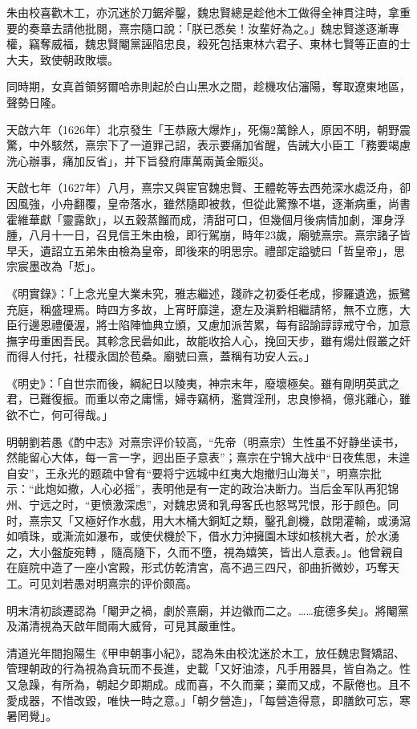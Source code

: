 朱由校喜歡木工，亦沉迷於刀鋸斧鑿，魏忠賢總是趁他木工做得全神貫注時，拿重要的奏章去請他批閱，熹宗隨口說：「朕已悉矣！汝輩好為之。」魏忠賢遂逐漸專權，竊奪威福，魏忠賢閹黨誣陷忠良，殺死包括東林六君子、東林七賢等正直的士大夫，致使朝政敗壞。

同時期，女真首領努爾哈赤則起於白山黑水之間，趁機攻佔瀋陽，奪取遼東地區，聲勢日隆。

天啟六年（1626年）北京發生「王恭廠大爆炸」，死傷2萬餘人，原因不明，朝野震驚，中外駭然，熹宗下了一道罪己詔，表示要痛加省醒，告誡大小臣工「務要竭慮洗心辦事，痛加反省」，并下旨發府庫萬兩黃金賑災。

天啟七年（1627年）八月，熹宗又與宦官魏忠賢、王體乾等去西苑深水處泛舟，卻因風強，小舟翻覆，皇帝落水，雖然隨即被救，但從此驚豫不堪，逐漸病重，尚書霍維華獻「靈露飲」，以五穀蒸餾而成，清甜可口，但幾個月後病情加劇，渾身浮腫，八月十一日，召見信王朱由檢，即行駕崩，時年23歲，廟號熹宗。熹宗諸子皆早夭，遺詔立五弟朱由檢為皇帝，即後來的明思宗。禮部定謚號曰「哲皇帝」，思宗宸墨改為「悊」。

《明實錄》：「上念光皇大業未究，雅志繼述，踐祚之初委任老成，摉羅遺逸，振鷺充庭，稱盛理焉。時四方多故，上宵旴靡遑，遼左及滇黔相繼請帑，無不立應，大臣行邊恩禮優渥，將士陷陣恤典立頒，又慮加派苦累，每有詔諭諄諄戒守令，加意撫字毋重困吾民。其軫念民碞如此，故能收拾人心，挽回天步，雖有煬灶假叢之奸而得人付托，社稷永固於苞桑。廟號曰熹，蓋稱有功安人云。」

《明史》：「自世宗而後，綱紀日以陵夷，神宗末年，廢壞極矣。雖有剛明英武之君，已難復振。而重以帝之庸懦，婦寺竊柄，濫賞淫刑，忠良慘禍，億兆離心，雖欲不亡，何可得哉。」

明朝劉若愚《酌中志》对熹宗评价较高，“先帝（明熹宗）生性虽不好静坐读书，然能留心大体，每一言一字，迥出臣子意表”；熹宗在宁锦大战中“日夜焦思，未遑自安”，王永光的题疏中曾有“要将宁远城中红夷大炮撤归山海关”，明熹宗批示：“此炮如撤，人心必摇”，表明他是有一定的政治决断力。当后金军队再犯锦州、宁远之时，“更愤激深虑”，对魏忠贤和乳母客氏也怒骂咒恨，形于颜色。同时，熹宗又「又極好作水戲，用大木桶大銅缸之類，鑿孔創機，啟閉灌輸，或湧瀉如噴珠，或澌流如瀑布，或使伏機於下，借水力沖擁園木球如核桃大者，於水湧之，大小盤旋宛轉 ，隨高隨下，久而不墮，視為嬉笑，皆出人意表。」。他曾親自在庭院中造了一座小宮殿，形式仿乾清宮，高不過三四尺，卻曲折微妙，巧奪天工。可见刘若愚对明熹宗的评价颇高。

明末清初談遷認為「閹尹之禍，劇於熹廟，并边徽而二之。……疵德多矣」。將閹黨及滿清視為天啟年間兩大威脅，可見其嚴重性。

清道光年間抱陽生《甲申朝事小紀》，認為朱由校沈迷於木工，放任魏忠賢矯詔、管理朝政的行為視為貪玩而不長進，史載「又好油漆，凡手用器具，皆自為之。性又急躁，有所為，朝起夕即期成。成而喜，不久而棄；棄而又成，不厭倦也。且不愛成器，不惜改毀，唯快一時之意。」「朝夕營造」，「每營造得意，即膳飲可忘，寒暑罔覺」。

